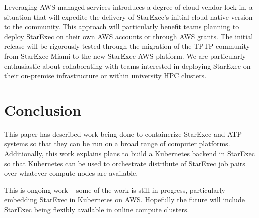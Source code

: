 \documentclass{easychair}
\begin{document}
Leveraging AWS-managed services introduces a degree of cloud vendor lock-in, a situation that
will expedite the delivery of StarExec's initial cloud-native version to the community. 
This approach will particularly benefit teams planning to deploy StarExec on their own AWS 
accounts or through AWS grants.
The initial release will be rigorously tested through the migration of the TPTP community from 
StarExec Miami to the new StarExec AWS platform. 
We are particularly enthusiastic about collaborating with teams interested in deploying StarExec 
on their on-premise infrastructure or within university HPC clusters.

\section{Conclusion}
\label{Conclusion}

This paper has described work being done to containerize StarExec and ATP systems so that they 
can be run on a broad range of computer platforms.
Additionally, this work explains plans to build a Kubernetes backend in StarExec so that 
Kubernetes can be used to orchestrate distribute of StarExec job pairs over whatever compute 
nodes are available.

This is ongoing work -- some of the work is still in progress, particularly embedding StarExec in 
Kubernetes on AWS.
Hopefully the future will include StarExec being flexibly available in online compute clusters.



\appendix

\newpage
\end{document}
